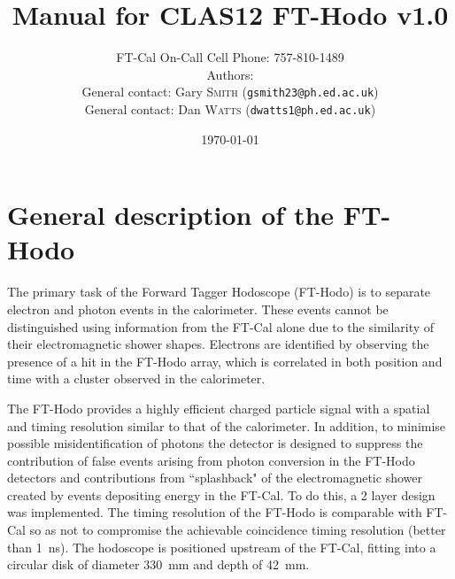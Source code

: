 \documentclass[12pt]{article}
\title{Manual for CLAS12 FT-Hodo v1.0}
\author{FT-Cal On-Call Cell Phone: 757-810-1489 \\ 
Authors: \\
General contact: Gary \textsc{Smith} (\texttt{gsmith23@ph.ed.ac.uk})\\ 
General contact: Dan \textsc{Watts} (\texttt{dwatts1@ph.ed.ac.uk})\\ 
}
\date{\today} %
\begin{document}
\maketitle{}

\tableofcontents

\newpage
   \section{General description of the FT-Hodo}
The primary task of the Forward Tagger Hodoscope (FT-Hodo) is to separate electron and photon events in the calorimeter. These events cannot be distinguished using information from the FT-Cal alone due to the similarity of their electromagnetic shower shapes. Electrons are identified by observing the presence of a hit in the FT-Hodo array, which is correlated in both position and time with a cluster observed in the calorimeter. 

The FT-Hodo provides a highly efficient charged particle signal with a spatial and timing resolution similar to that of the calorimeter. In addition, to minimise possible misidentification of photons the detector is designed to suppress the contribution of false events arising from photon conversion in the FT-Hodo detectors and contributions from ``splashback" of the electromagnetic shower created by events depositing energy in the FT-Cal. To do this, a 2 layer design was implemented. The timing resolution of the FT-Hodo is comparable with FT-Cal so as not to compromise the achievable coincidence timing resolution (better than 1~ns).  The hodoscope is positioned upstream of the FT-Cal, fitting into a circular disk of diameter 330~mm and depth of 42~mm.
\end{document}
